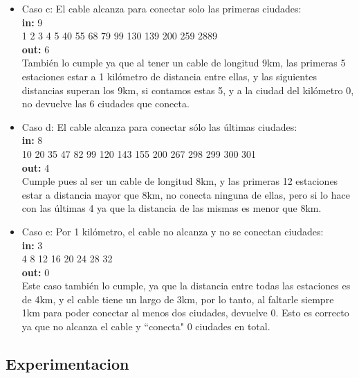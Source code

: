 \begin{itemize}

\item Caso c: El cable alcanza para conectar solo las primeras ciudades:\\
\textbf{in:}
9\\
1 2 3 4 5 40 55 68 79 99 130 139 200 259 2889\\
\textbf{out:}
6\\

También lo cumple ya que al tener un cable de longitud 9km, las primeras 5 estaciones estar a 1 kilómetro de distancia entre ellas, y las siguientes distancias superan los 9km, si contamos estas 5, y a la ciudad del kilómetro 0, no devuelve las 6 ciudades que conecta.\\

\item Caso d: El cable alcanza para conectar sólo las últimas ciudades:\\
\textbf{in:}
8\\
10 20 35 47 82 99 120 143 155 200 267 298 299 300 301\\
\textbf{out:}
4\\

Cumple pues al ser un cable de longitud 8km, y las primeras 12 estaciones estar a distancia mayor que 8km, no conecta ninguna de ellas, pero si lo hace con las últimas 4 ya que la distancia de las mismas es menor que 8km. \\

\item Caso e: Por 1 kilómetro, el cable no alcanza y no se conectan ciudades:\\
\textbf{in:}
3\\
4 8 12 16 20 24 28 32 \\
\textbf{out:}
0\\

Este caso también lo cumple, ya que la distancia entre todas las estaciones es de 4km, y el cable tiene un largo de 3km, por lo tanto, al faltarle siempre 1km para poder conectar al menos dos ciudades, devuelve 0. Esto es correcto ya que no alcanza el cable y ``conecta" 0 ciudades en total. \\

\end{itemize}



\subsection{Experimentacion}


